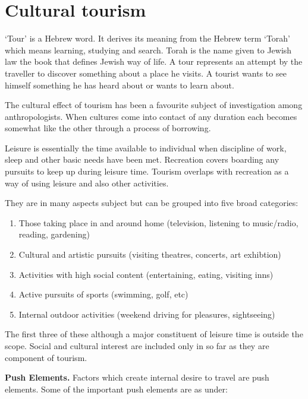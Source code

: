 \chapter{Cultural tourism} %
\label{cha:ct}

`Tour' is a Hebrew word. It derives its meaning from the Hebrew term `Torah' which means learning, studying and search. Torah is the name given to Jewish law the book that defines Jewish way of life. A tour represents an attempt by the traveller to discover something about a place he visits. A tourist wants to see himself something he has heard about or wants to learn about.

The cultural effect of tourism has been a favourite subject of investigation among anthropologists. When cultures come into contact of any duration each becomes somewhat like the other through a process of borrowing.

Leisure is essentially the time available to individual when discipline of work, sleep and other basic needs have been met. Recreation covers boarding any pursuits to keep up during leisure time. Tourism overlaps with recreation as a way of using leisure and also other activities.

They are in many aspects subject but can be grouped into five broad categories:

\begin{enumerate}
  \item Those taking place in and around home (television, listening to music/radio, reading, gardening)
  \item Cultural and artistic pursuits (visiting theatres, concerts, art exhibtion)
  \item Activities with high social content (entertaining, eating, visiting inns)
  \item Active pursuits of sports (swimming, golf, etc)
  \item Internal outdoor activities (weekend driving for pleasures, sightseeing)
\end{enumerate}

The first three of these although a major constituent of leisure time is outside the scope. Social and cultural interest are included only in so far as they are component of tourism.

\textbf{Push Elements.} Factors which create internal desire to travel are push elements. Some of the important push elements are as under:

